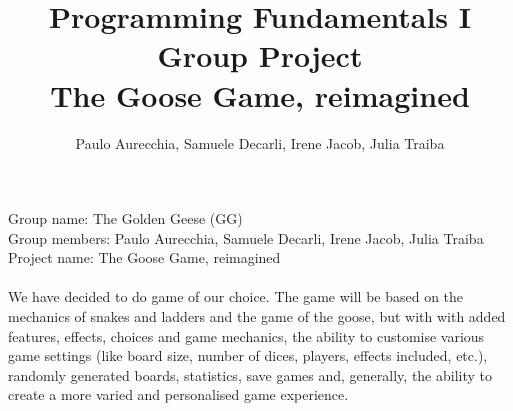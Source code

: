 \documentclass[12pt, a4paper]{article}
\title{Programming Fundamentals I\\ Group Project\\ The Goose Game, reimagined}
\author{Paulo Aurecchia, Samuele Decarli, Irene Jacob, Julia Traiba}
\date{}
\begin{document}
\maketitle

\noindent Group name: The Golden Geese (GG)\\
Group members: Paulo Aurecchia, Samuele Decarli, Irene Jacob, Julia Traiba\\
Project name: The Goose Game, reimagined\\
\\
We have decided to do game of our choice. The game will be based on the mechanics of snakes and ladders and the game of the goose, but with with added features, effects, choices and game mechanics, the ability to customise various game settings (like board size, number of dices, players, effects included, etc.), randomly generated boards, statistics, save games and, generally, the ability to create a more varied and personalised game experience.\\
\end{document}
